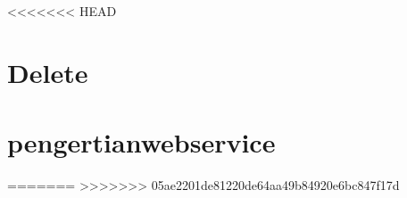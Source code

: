 \documentclass{wileySix}
\begin{document}
%


%

<<<<<<< HEAD
\chapter[Method Delete]
{Delete}


\chapter[Pengertian Web Service]
{pengertianwebservice}

=======
>>>>>>> 05ae2201de81220de64aa49b84920e6bc847f17d

%

%

%


%

%
\end{document}
